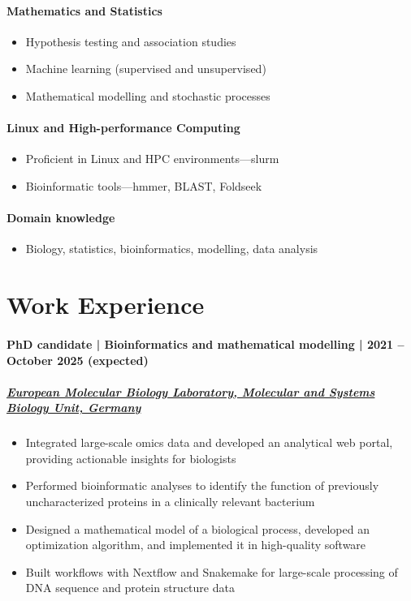 \documentclass[
	DIV=23,
]{scrartcl}
\begin{document}
\paragraph{Mathematics and Statistics}
\begin{itemize}
	\item Hypothesis testing and association studies
	\item Machine learning (supervised and unsupervised)
	\item Mathematical modelling and stochastic processes
\end{itemize}

\paragraph{Linux and High-performance Computing}
\begin{itemize}
	\item Proficient in Linux and HPC environments---slurm
	\item Bioinformatic tools---hmmer, BLAST, Foldseek
\end{itemize}

\paragraph{Domain knowledge}
\begin{itemize}
	\item Biology, statistics, bioinformatics, modelling, data analysis
\end{itemize}

\section*{Work Experience}

\paragraph{PhD candidate | Bioinformatics and mathematical modelling | 2021 -- October 2025 (expected)}
\subparagraph{\href{https://embl.org/groups/bork}{European Molecular Biology Laboratory, Molecular and Systems Biology Unit, Germany}}
\begin{itemize}
	\item Integrated large-scale omics data and developed an analytical web portal, providing actionable insights for biologists
	\item Performed bioinformatic analyses to identify the function of previously uncharacterized proteins in a clinically relevant bacterium
	\item Designed a mathematical model of a biological process, developed an optimization algorithm, and implemented it in high-quality software
	\item Built workflows with Nextflow and Snakemake for large-scale processing of DNA sequence and protein structure data
\end{itemize}
\end{document}
